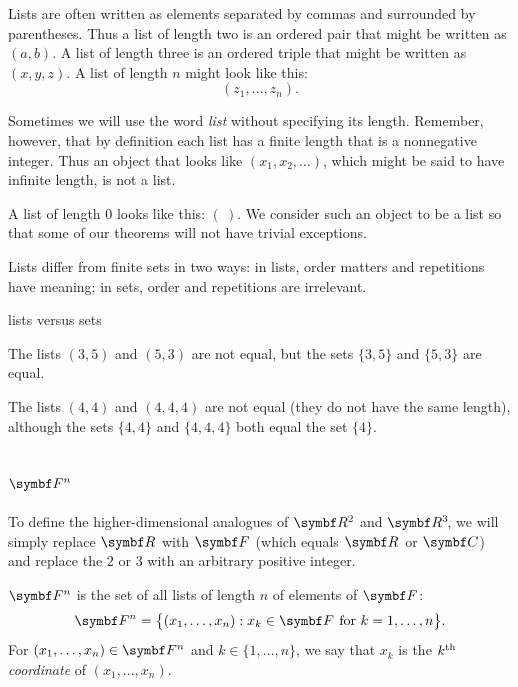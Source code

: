 
Lists are often written as elements separated by commas and surrounded by parentheses. Thus a list of length two is an ordered pair that might be written as $(a, b)$. A list of length three is an ordered triple that might be written as $(x,y,z)$. A list of length $n$ might look like this:
\[
(z_1, \dots, z_n).
\]

Sometimes we will use the word \emph{list} without specifying its length. Remember, however, that by definition each list has a finite length that is a nonnegative integer. Thus an object that looks like
$
(x_1, x_2, \dotsc )$,
which might be said to have infinite length, is not a list.

A list of length $0$ looks like this: $(\ )$.  We consider such an object to be
a list so that some of our theorems will not have trivial exceptions.

Lists differ from finite sets in two ways: in lists, order matters and  repetitions
have meaning; in sets, order and repetitions are irrelevant.

\begin{example}{lists versus sets}
\begin{Itemize}
\item
The lists $(3,5)$ and $(5,3)$ are not equal, but the sets $\{3,5\}$ and
$\{5,3\}$ are equal.
\item
The lists $(4,4)$ and $(4, 4, 4)$ are not equal
(they do not
have the same length), although the sets $\{4,4\}$ and $\{4, 4, 4\}$ both
equal the set $\{4\}$.
\end{Itemize}
\exampleitemend
\vspace{2bp}
\end{example}

    \subsection{$\F n$}

To define the higher-dimensional analogues of $\R{2}$ and $\RR{3}$, we
will simply replace $\R{}$ with $\F{}$ (which equals $\R{}$ or $\C{}$) and replace the $2$ or
$3$ with an arbitrary positive integer.


{$\F{n}$ is the set of all
lists of length $n$ of elements of $\F{}$:
\[
\F{n} = \br[\big]{(x_1, \dots, x_n): x_k \in\F{} \mbox{\ for\ } k = 1, \dots, n }.
\]
For $(x_1, \dots, x_n) \in \F{n}$ and $k \in \{1, \dots, n\}$, we say
that $x_k$ is the $k^{\text{{th}}}$ \emph{coordinate} of $(x_1, \dots, x_n)$.}

